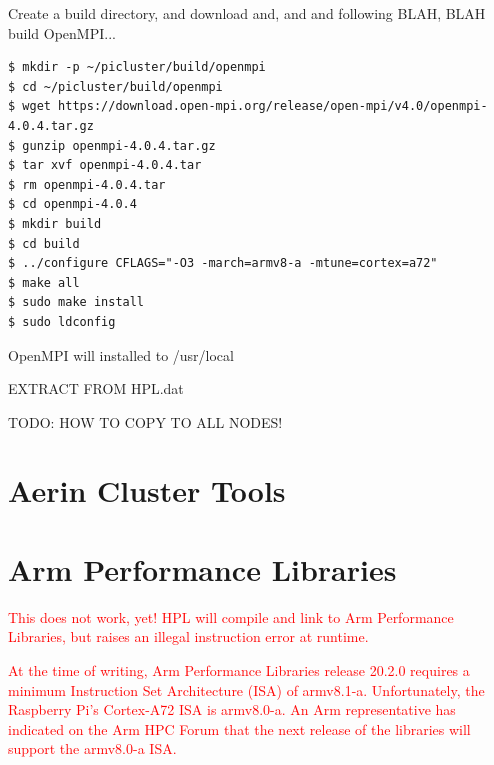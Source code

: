 \documentclass{report}
\begin{document}
Create a build directory, and download and, and and following BLAH, BLAH build OpenMPI...

\lstset{style=type}
\begin{lstlisting}
$ mkdir -p ~/picluster/build/openmpi
$ cd ~/picluster/build/openmpi
$ wget https://download.open-mpi.org/release/open-mpi/v4.0/openmpi-4.0.4.tar.gz
$ gunzip openmpi-4.0.4.tar.gz
$ tar xvf openmpi-4.0.4.tar
$ rm openmpi-4.0.4.tar
$ cd openmpi-4.0.4
$ mkdir build
$ cd build
$ ../configure CFLAGS="-O3 -march=armv8-a -mtune=cortex=a72"
$ make all
$ sudo make install
$ sudo ldconfig
\end{lstlisting}

OpenMPI will installed to /usr/local

EXTRACT FROM HPL.dat


TODO: HOW TO COPY TO ALL NODES!


%
%
\chapter{Aerin Cluster Tools}








%
%

\chapter{Arm Performance Libraries}

\textcolor{red}{This does not work, yet! HPL will compile and link to Arm Performance Libraries, but raises an illegal instruction error at runtime.}

\textcolor{red}{At the time of writing, Arm Performance Libraries release 20.2.0 requires a minimum Instruction Set Architecture (ISA) of armv8.1-a. Unfortunately, the Raspberry Pi's Cortex-A72 ISA is armv8.0-a. An Arm representative has indicated on the Arm HPC Forum that the next release of the libraries will support the armv8.0-a ISA.}
\end{document}

